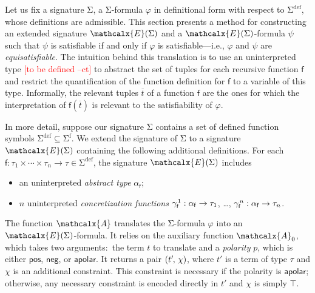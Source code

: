 \documentclass[runningheads,a4paper]{llncs}
\newcommand{\con}[1]{\mathsf{#1}}
\renewcommand\vec[1]{\overline{#1}}
\let\oldSigma=\Sigma
\def\Sigma{\mathrm{\oldSigma}}
\newcommand{\conv}{\mathcalx{A}}
\newcommand{\sfuns}[1]{#1^\mathrm{f}}
\newcommand{\sfundefs}[1]{#1^\mathrm{def}}
\newcommand{\pnone}{\con{apolar}}
\newcommand{\ppos}{\con{pos}}
\newcommand{\pneg}{\con{neg}}
\newcommand{\ltrue}{\top}
\newcommand\concret{\gamma} %
\newcommand{\farg}[1]{\concret_{#1}}
\newcommand{\fargx}[2]{\concret^{\vthinspace#2}_{#1}}
\newcommand{\fargsort}[1]{\alpha_{#1}}
\newcommand{\extendsig}[1]{\mathcalx{E}( #1 )}
\newcommand{\rem}[1]{\textcolor{red}{[#1]}}
\newcommand{\ct}[1]{\rem{#1 --ct}}
\newcommand{\negvthinspace}{\kern-0.083333em}
\newcommand{\vthinspace}{\kern+0.083333em}
\begin{document}
Let us fix a signature $\Sigma$, a $\Sigma$-formula
$\varphi$ in definitional form with respect to $\sfundefs{\Sigma}$,
whose definitions are admissible.
This section presents a method for constructing an extended signature
$\extendsig{ \Sigma }$ and a $\extendsig{ \Sigma }$-formula $\psi$ such that
$\psi$ is satisfiable if and only if $\varphi$ is satisfiable---i.e.,
$\varphi$ and $\psi$ are \emph{equisatisfiable}.
The intuition behind this translation
is to use an uninterpreted type \ct{to be defined} to abstract the set of
 tuples for each recursive function $\con{f}$ and restrict the
quantification of the function definition for $\con{f}$ to a variable of this
type. Informally, the relevant tuples $\vec t$ of a function $\con{f}$ are the
ones for which the interpretation of $\con{f}( \vec t )$ is relevant to the
satisfiability of $\varphi$.

In more detail,
suppose our signature $\Sigma$ contains a set of defined function symbols $\sfundefs{\Sigma} \subseteq \sfuns{\Sigma}$.
We extend the signature of $\Sigma$ to a signature $\extendsig{\Sigma}$ containing the following additional definitions.
For each $\con{f} : \tau_1 \times \cdots \times \tau_n \rightarrow \tau \in \sfundefs{\Sigma}$,
the signature $\extendsig{\Sigma}$ includes
\begin{itemize}
\item an uninterpreted \emph{abstract type} $\fargsort{\con{f}}$;
\item $n$ uninterpreted \emph{concretization functions} $\fargx{\con{f}}{1} : \fargsort{\con{f}} \rightarrow \tau_1$, \ldots, $\fargx{\con{f}}{n} : \fargsort{\con{f}} \rightarrow \tau_n$.
\end{itemize}

The function $\conv$ translates the $\Sigma$-formula
$\varphi$ into an $\extendsig{\Sigma}$-formula. It relies
on the auxiliary function $\conv_0$, which takes two arguments:\ the term $t$
to translate and a \emph{polarity} $p$, which is either $\ppos$, $\pneg$, or
$\pnone$. It returns a pair $( t'\negvthinspace,\, \chi )$, where $t'$ is a term of
type $\tau$ and $\chi$ is an additional constraint.
This constraint is necessary if the polarity is $\pnone$; otherwise, any necessary
constraint is encoded directly in $t'$ and $\chi$ is simply $\ltrue$.
\end{document}
